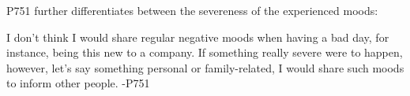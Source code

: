 

P751 further differentiates between the severeness of the experienced moods:

\begin{displayquote}
    I don't think I would share regular negative moods when having a bad day, for instance, being this new to a company. If something really severe were to happen, however, let's say something personal or family-related, I would share such moods to inform other people. -P751
\end{displayquote}






